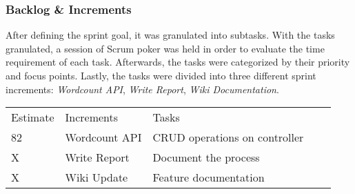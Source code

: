 \subsubsection{Backlog \& Increments}
After defining the sprint goal, it was granulated into subtasks. 
With the tasks granulated, a session of Scrum poker was held in order to evaluate the time requirement of each task. 
Afterwards, the tasks were categorized by their priority and focus points.
Lastly, the tasks were divided into three different sprint increments: \textit{Wordcount API}, \textit{Write Report}, \textit{Wiki Documentation}. 


\begin{table}[]
\begin{tabular}{|l|l|l|ll}
\cline{1-3}
Estimate & Increments                         & Tasks                         &  &  \\ \cline{1-3}
82       & \multicolumn{1}{c|}{Wordcount API} & CRUD operations on controller &  &  \\ \cline{1-3}
X        & Write Report                       & Document the process          &  &  \\ \cline{1-3}
X        & Wiki Update                        & Feature documentation         &  &  \\ \cline{1-3}
\end{tabular}
\end{table}





